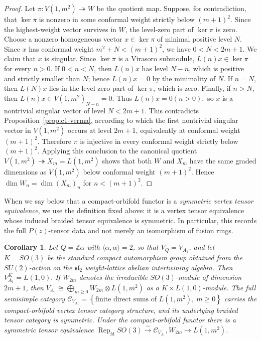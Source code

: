 \documentclass[10pt,a4paper]{amsart}
\numberwithin{equation}{section} \newtheorem{thm}{Theorem}[section] \newtheorem{lem}[thm]{Lemma} \newtheorem{ex}[thm]{Example} \newtheorem{prop}[thm]{Proposition} \newtheorem{cor}[thm]{Corollary} \newtheorem{defi}[thm]{Definition} \newtheorem{rmk}[thm]{Remark} \newtheorem{notation}[thm]{Notation}
\newcommand{\Rep}{\operatorname{Rep}}
\def\Z{\mathbb{Z}} \def\N{\mathbb{N}} \def\A{\mathbb{A}} \def\C{\mathbb{C}} \def\R{\mathbb{R}} \def\Q{\mathbb{Q}} \def\F{\mathbb{F}}
\begin{document}
\begin{proof}
Let $ \pi:V(1,m^2)\twoheadrightarrow W $ be the quotient map. Suppose, for contradiction, that \(\ker\pi\) is nonzero in some conformal weight strictly below \((m+1)^2\). Since the highest-weight vector survives in \(W\), the level-zero part of \(\ker\pi\) is zero. Choose a nonzero homogeneous vector $ x\in\ker\pi $ of minimal positive level \(N\). Since \(x\) has conformal weight \(m^2+N<(m+1)^2\), we have $ 0<N<2m+1. $ We claim that \(x\) is singular. Since \(\ker\pi\) is a Virasoro submodule, \(L(n)x\in\ker\pi\) for every \(n>0\). If \(0<n<N\), then \(L(n)x\) has level \(N-n\), which is positive and strictly smaller than \(N\); hence \(L(n)x=0\) by the minimality of \(N\). If \(n=N\), then \(L(N)x\) lies in the level-zero part of \(\ker\pi\), which is zero. Finally, if \(n>N\), then $ L(n)x\in V(1,m^2)_{N-n}=0. $ Thus $L(n)x=0(n>0),$ so \(x\) is a nontrivial singular vector of level \(N<2m+1\). This contradicts Proposition~\ref{prop:c1-verma}, according to which the first nontrivial singular vector in \(V(1,m^2)\) occurs at level \(2m+1\), equivalently at conformal weight $ (m+1)^2. $ Therefore \(\pi\) is injective in every conformal weight strictly below \((m+1)^2\). Applying this conclusion to the canonical quotient $ V(1,m^2)\twoheadrightarrow X_m=L(1,m^2) $ shows that both \(W\) and \(X_m\) have the same graded dimensions as \(V(1,m^2)\) below conformal weight \((m+1)^2\). Hence $ \dim W_n=\dim (X_m)_n$ for $n<(m+1)^2. $
\end{proof}

When we say below that a compact-orbifold functor is a \emph{symmetric vertex tensor equivalence}, we use the definition fixed above: it is a vertex tensor equivalence whose induced braided tensor equivalence is symmetric. In particular, this records the full $P(z)$-tensor data and not merely an isomorphism of fusion rings.

\begin{cor}
\label{cor:McRae-A1-SO3}
Let \(Q=\Z\alpha\) with \(\langle\alpha,\alpha\rangle=2\), so that \(V_Q=V_{A_1}\), and let \(K=SO(3)\) be the standard compact automorphism group obtained from the \(SU(2)\)-action on the \(\mathfrak{sl}_2\) weight-lattice abelian intertwining algebra. Then \(V_{A_1}^{K}=L(1,0).\) If \(W_{2m}\) denotes the irreducible \(SO(3)\)-module of dimension \(2m+1\), then \(V_{A_1}\cong\bigoplus_{m\ge0}W_{2m}\otimes L(1,m^2)\) as a \(K\times L(1,0)\)-module. The full semisimple category \(\mathcal C_{V_{A_1}}=\left\{\text{finite direct sums of }L(1,m^2),\ m\ge0\right\}\) carries the compact-orbifold vertex tensor category structure, and its underlying braided tensor category is symmetric. Under the compact-orbifold functor there is a symmetric tensor equivalence \(\Rep_{\mathrm{fd}}SO(3) \overset{\sim}{\longrightarrow} \mathcal C_{V_{A_1}}, W_{2m}\longmapsto L(1,m^2)\).
\end{cor}
\end{document}
